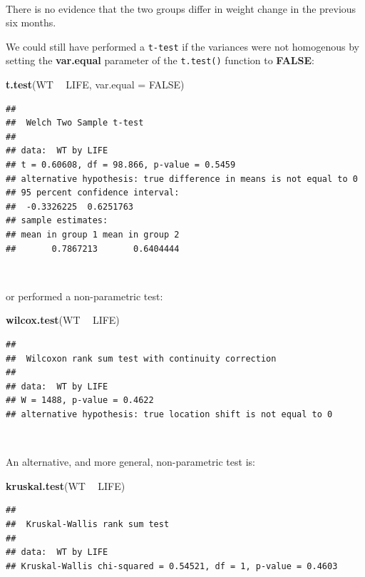 \documentclass[12pt,a4paper]{book}
\newenvironment{Shaded}{\begin{snugshade}}{\end{snugshade}}
\newcommand{\KeywordTok}[1]{\textcolor[rgb]{0.13,0.29,0.53}{\textbf{#1}}}
\newcommand{\DataTypeTok}[1]{\textcolor[rgb]{0.13,0.29,0.53}{#1}}
\newcommand{\StringTok}[1]{\textcolor[rgb]{0.31,0.60,0.02}{#1}}
\newcommand{\OtherTok}[1]{\textcolor[rgb]{0.56,0.35,0.01}{#1}}
\newcommand{\OperatorTok}[1]{\textcolor[rgb]{0.81,0.36,0.00}{\textbf{#1}}}
\newcommand{\NormalTok}[1]{#1}
\theoremstyle{definition}
\theoremstyle{definition}
\theoremstyle{definition}
\theoremstyle{remark}
\begin{document}
~

There is no evidence that the two groups differ in weight change in the
previous six months.

We could still have performed a \texttt{t-test} if the variances were
not homogenous by setting the \textbf{var.equal} parameter of the
\texttt{t.test()} function to \textbf{FALSE}:

\begin{Shaded}
\begin{Highlighting}[]
\KeywordTok{t.test}\NormalTok{(WT }\OperatorTok{~}\StringTok{ }\NormalTok{LIFE, }\DataTypeTok{var.equal =} \OtherTok{FALSE}\NormalTok{)}
\end{Highlighting}
\end{Shaded}

\begin{verbatim}
## 
##  Welch Two Sample t-test
## 
## data:  WT by LIFE
## t = 0.60608, df = 98.866, p-value = 0.5459
## alternative hypothesis: true difference in means is not equal to 0
## 95 percent confidence interval:
##  -0.3326225  0.6251763
## sample estimates:
## mean in group 1 mean in group 2 
##       0.7867213       0.6404444
\end{verbatim}

~

or performed a non-parametric test:

\begin{Shaded}
\begin{Highlighting}[]
\KeywordTok{wilcox.test}\NormalTok{(WT }\OperatorTok{~}\StringTok{ }\NormalTok{LIFE)}
\end{Highlighting}
\end{Shaded}

\begin{verbatim}
## 
##  Wilcoxon rank sum test with continuity correction
## 
## data:  WT by LIFE
## W = 1488, p-value = 0.4622
## alternative hypothesis: true location shift is not equal to 0
\end{verbatim}

~

An alternative, and more general, non-parametric test is:

\begin{Shaded}
\begin{Highlighting}[]
\KeywordTok{kruskal.test}\NormalTok{(WT }\OperatorTok{~}\StringTok{ }\NormalTok{LIFE)}
\end{Highlighting}
\end{Shaded}

\begin{verbatim}
## 
##  Kruskal-Wallis rank sum test
## 
## data:  WT by LIFE
## Kruskal-Wallis chi-squared = 0.54521, df = 1, p-value = 0.4603
\end{verbatim}
\end{document}
